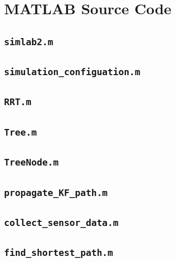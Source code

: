 \documentclass[11pt]{article}
\begin{document}
\appendix
\section{MATLAB Source Code}

\subsection*{\texttt{simlab2.m}}


\subsection*{\texttt{simulation\_configuation.m}}


\subsection*{\texttt{RRT.m}}


\subsection*{\texttt{Tree.m}}


\subsection*{\texttt{TreeNode.m}}


\subsection*{\texttt{propagate\_KF\_path.m}}


\subsection*{\texttt{collect\_sensor\_data.m}}


\subsection*{\texttt{find\_shortest\_path.m}}

\end{document}
